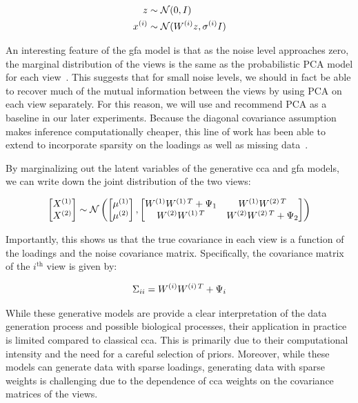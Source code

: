 \begin{align}
    z& \sim \mathcal{N}(0, I)\\
    x^{(i)} & \sim \mathcal{N}(W^{(i)} z, \sigma^{(i)}I)
\end{align}

An interesting feature of the \acrshort{gfa} model is that as the noise level approaches zero, the marginal distribution of the views is the same as the probabilistic PCA model for each view~\citep{tipping1999probabilistic}.
This suggests that for small noise levels, we should in fact be able to recover much of the mutual information between the views by using PCA on each view separately.
For this reason, we will use and recommend PCA as a baseline in our later experiments.
Because the diagonal covariance assumption makes inference computationally cheaper, this line of work has been able to extend to incorporate sparsity on the loadings\citep{virtanen2011bayesian} as well as missing data~\citep{ferreira2022hierarchical}.

By marginalizing out the latent variables of the generative \acrshort{cca} and \acrshort{gfa} models, we can write down the joint distribution of the two views:

\begin{align}
    \begin{bmatrix} X^{(1)} \\ X^{(2)} \end{bmatrix} \sim \mathcal{N} \left( \begin{bmatrix} \mu^{(1)} \\ \mu^{(2)} \end{bmatrix}, \begin{bmatrix} W^{(1)}W^{(1)\,T} + \Psi_1 & W^{(1)}W^{(2)\,T} \\ W^{(2)}W^{(1)\,T} & W^{(2)}W^{(2)\,T} + \Psi_2 \end{bmatrix} \right)
\end{align}

Importantly, this shows us that the true covariance in each view is a function of the \gls{loadings} and the noise covariance matrix.
Specifically, the covariance matrix of the $i^{\text{th}}$ view is given by:

\begin{align}
    \Sigma_{ii} = W^{(i)}W^{(i)\,T} + \Psi_i
\end{align}

While these generative models are provide a clear interpretation of the data generation process and possible biological processes, their application in practice is limited compared to classical \acrshort{cca}.
This is primarily due to their computational intensity and the need for a careful selection of priors.
Moreover, while these models can generate data with sparse loadings, generating data with sparse weights is challenging due to the dependence of \acrshort{cca} weights on the covariance matrices of the views.

